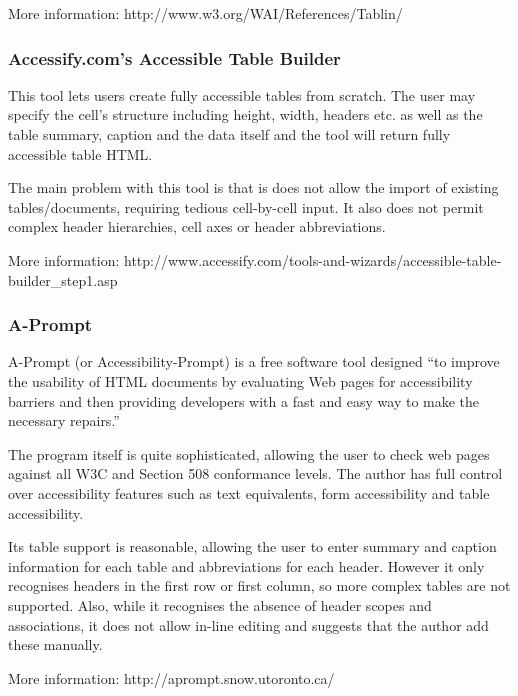More information: http://www.w3.org/WAI/References/Tablin/

\subsubsection{Accessify.com's Accessible Table Builder}

This tool lets users create fully accessible tables from scratch. The user
may specify the cell's structure including height, width, headers etc. as well
as the table summary, caption and the data itself and the tool will return
fully accessible table HTML.

The main problem with this tool is that is does not allow the import of
existing tables/documents, requiring tedious cell-by-cell input. It also does
not permit complex header hierarchies, cell axes or header abbreviations.

More information:\newline
http://www.accessify.com/tools-and-wizards/accessible-table-builder\_step1.asp

\subsubsection{A-Prompt}

A-Prompt (or Accessibility-Prompt) is a free software tool designed ``to improve
the usability of HTML documents by evaluating Web pages for accessibility
barriers and then providing developers with a fast and easy way to make the
necessary repairs.''

The program itself is quite sophisticated, allowing the user to check web pages
against all W3C and Section 508 conformance levels. The author has full control
over accessibility features such as text equivalents, form accessibility and
table accessibility.

Its table support is reasonable, allowing the user to enter summary and caption
information for each table and abbreviations for each header. However it only
recognises headers in the first row or first column, so more complex tables
are not supported. Also, while it recognises the absence of header scopes
and associations, it does not allow in-line editing and suggests that the
author add these manually.

More information: http://aprompt.snow.utoronto.ca/



